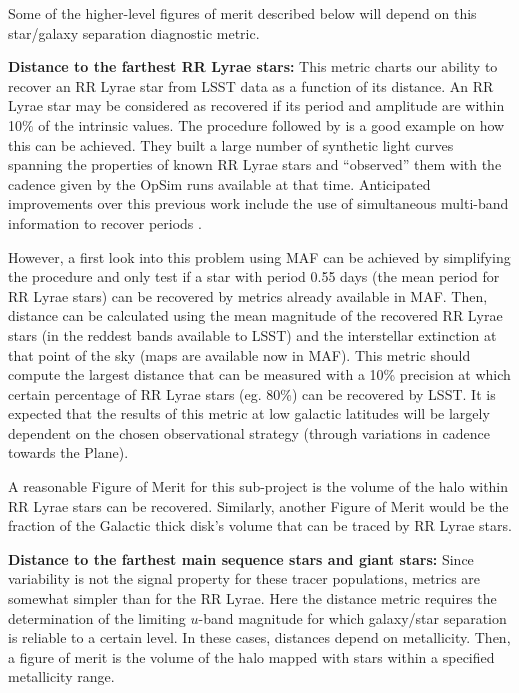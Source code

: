 Some of the higher-level figures of merit described below will depend on this star/galaxy separation diagnostic metric.

\textbf{Distance to the farthest RR Lyrae stars:} This metric charts our ability to
recover an RR Lyrae star from LSST data as a function of its distance. An RR Lyrae star may be
considered as recovered if its period and amplitude are within 10\% of the intrinsic values.
The procedure followed by \citet{2012AJ....144....9O} is a good example on how this can be
achieved. They built a large number of synthetic light curves spanning the properties of
known RR Lyrae stars and ``observed'' them with the cadence given by the OpSim runs
available at that time. Anticipated improvements over this previous work include the use
of simultaneous multi-band information to recover periods \citep[e.g.,][]{vanderplas15,vivas16}.

However, a first look into this problem using MAF can be achieved
by simplifying the procedure and only test if a star with period 0.55 days (the mean period for
RR Lyrae stars) can be recovered by metrics already available in MAF.
Then, distance can be calculated using the mean magnitude of the recovered RR Lyrae stars
(in the reddest bands available to LSST) and the interstellar extinction at that point of the sky (maps are available
now in MAF).  This metric should compute the largest distance that can be measured with a 10\% precision
at which certain percentage of RR
Lyrae stars (eg. 80\%) can be recovered by LSST. It is expected that the results
of this metric at low galactic latitudes will be largely dependent on the chosen observational
strategy (through variations in cadence towards the Plane).

A reasonable Figure of Merit for this sub-project is the volume of the
halo within RR Lyrae stars  can be recovered. Similarly, another Figure
of Merit would be the fraction of the Galactic thick disk's volume that
can be traced by RR Lyrae stars.

\textbf{Distance to the farthest main sequence stars and giant stars:}
Since variability is not the signal property for these tracer
populations, metrics are somewhat simpler than for the RR Lyrae.
Here the distance metric requires the determination of the limiting $u$-band
magnitude
for which galaxy/star separation is reliable to a certain level. In
these cases, distances depend on metallicity. Then, a figure of merit is
the volume of the halo mapped with stars within a specified metallicity
range.


